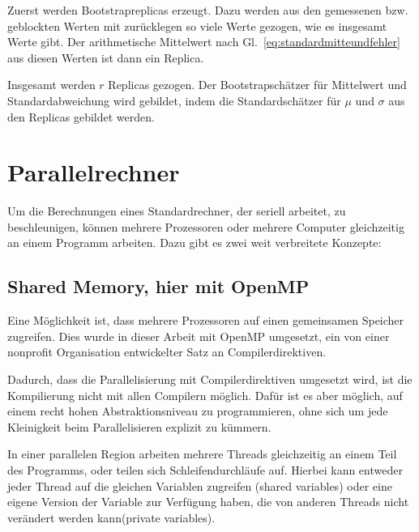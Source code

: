 	Zuerst werden Bootstrapreplicas erzeugt. Dazu werden aus den gemessenen bzw. geblockten Werten mit zurücklegen so viele Werte gezogen, wie es insgesamt Werte gibt. Der arithmetische Mittelwert nach Gl.~\ref{eq:standardmitteundfehler} aus diesen Werten ist dann ein Replica.
	
	Insgesamt werden $r$ Replicas gezogen. Der Bootstrapschätzer für Mittelwert und Standardabweichung wird gebildet, indem die Standardschätzer für $\mu$ und $\sigma$ aus den Replicas gebildet werden.
	
	


	\section{Parallelrechner}
	\label{sec:partheorie}
	Um die Berechnungen eines Standardrechner, der seriell arbeitet, zu beschleunigen, können mehrere Prozessoren oder mehrere Computer gleichzeitig an einem Programm arbeiten. Dazu gibt es zwei weit verbreitete Konzepte:
	\subsection{Shared Memory, hier mit OpenMP}
	\label{subsec:openmptheorie}
	Eine Möglichkeit ist, dass mehrere Prozessoren auf einen gemeinsamen Speicher zugreifen. Dies wurde in dieser Arbeit mit OpenMP umgesetzt, ein von einer nonprofit Organisation entwickelter Satz an Compilerdirektiven\cite{specificationsopenmp}.
	
	Dadurch, dass die Parallelisierung mit Compilerdirektiven umgesetzt wird, ist die Kompilierung nicht mit allen Compilern möglich. Dafür ist es aber möglich, auf einem recht hohen Abstraktionsniveau zu programmieren, ohne sich um jede Kleinigkeit beim Parallelisieren explizit zu kümmern\cite[vgl. ][S. 209]{pachecoparallel}.	
	
	In einer parallelen Region arbeiten mehrere Threads gleichzeitig an einem Teil des Programms, oder teilen sich Schleifendurchläufe auf. Hierbei kann entweder jeder Thread auf die gleichen Variablen zugreifen (shared variables) oder eine eigene Version der Variable zur Verfügung haben, die von anderen Threads nicht verändert werden kann(private variables)\cite[vgl. ][S. 231 f.]{pachecoparallel}. 
	
